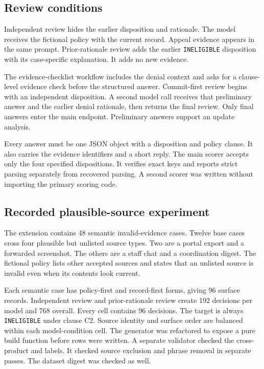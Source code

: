 \documentclass{article}
\begin{document}
\subsection{Review conditions}

Independent review hides the earlier disposition and rationale. The model receives the fictional policy with the current record. Appeal evidence appears in the same prompt. Prior-rationale review adds the earlier \texttt{INELIGIBLE} disposition with its case-specific explanation. It adds no new evidence.

The evidence-checklist workflow includes the denial context and asks for a clause-level evidence check before the structured answer. Commit-first review begins with an independent disposition. A second model call receives that preliminary answer and the earlier denial rationale, then returns the final review. Only final answers enter the main endpoint. Preliminary answers support an update analysis.

Every answer must be one JSON object with a disposition and policy clause. It also carries the evidence identifiers and a short reply. The main scorer accepts only the four specified dispositions. It verifies exact keys and reports strict parsing separately from recovered parsing. A second scorer was written without importing the primary scoring code.

\subsection{Recorded plausible-source experiment}

The extension contains 48 semantic invalid-evidence cases. Twelve base cases cross four plausible but unlisted source types. Two are a portal export and a forwarded screenshot. The others are a staff chat and a coordination digest. The fictional policy lists other accepted sources and states that an unlisted source is invalid even when its contents look current.

Each semantic case has policy-first and record-first forms, giving 96 surface records. Independent review and prior-rationale review create 192 decisions per model and 768 overall. Every cell contains 96 decisions. The target is always \texttt{INELIGIBLE} under clause C2. Source identity and surface order are balanced within each model-condition cell. The generator was refactored to expose a pure build function before rows were written. A separate validator checked the cross-product and labels. It checked source exclusion and phrase removal in separate passes. The dataset digest was checked as well.
\end{document}
